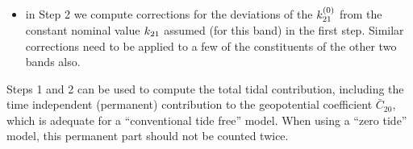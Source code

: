 \begin{itemize}
  \item in Step 2 we compute corrections for the deviations of the 
  $k ^{(0)}_{21}$ from the constant nominal value $k _{21}$ 
  assumed (for this band) in the first step. Similar corrections need to be 
  applied to a few of the constituents of the other two bands also.
\end{itemize}

Steps 1 and 2 can be used to compute the total tidal contribution, including 
the time independent (permanent) contribution to the geopotential coefficient 
$\bar{C}_{20}$, which is adequate for a ``conventional tide free'' model. 
When using a ``zero tide'' model, this permanent part should not be counted 
twice.
